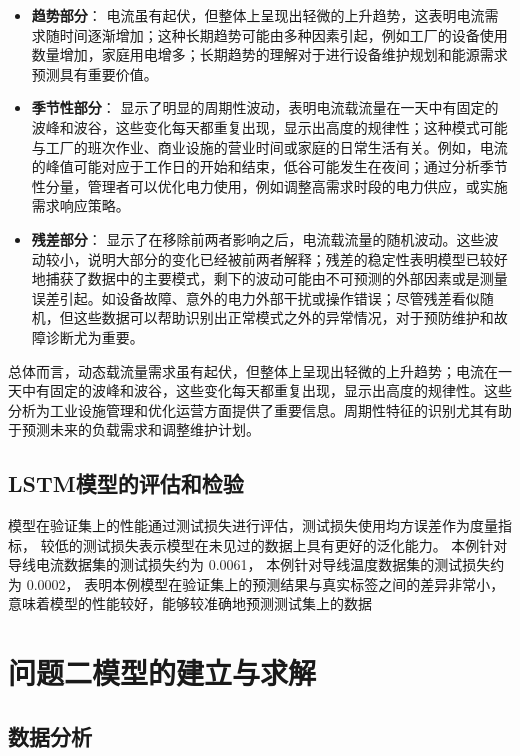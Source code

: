 \documentclass[withoutpreface,bwprint]{cumcmthesis}  %
\begin{document}
        \begin{itemize}
            \item \textbf{趋势部分}：
                电流虽有起伏，但整体上呈现出轻微的上升趋势，这表明电流需求随时间逐渐增加；这种长期趋势可能由多种因素引起，例如工厂的设备使用数量增加，家庭用电增多；长期趋势的理解对于进行设备维护规划和能源需求预测具有重要价值。
            \item \textbf{季节性部分}：
                显示了明显的周期性波动，表明电流载流量在一天中有固定的波峰和波谷，这些变化每天都重复出现，显示出高度的规律性；这种模式可能与工厂的班次作业、商业设施的营业时间或家庭的日常生活有关。例如，电流的峰值可能对应于工作日的开始和结束，低谷可能发生在夜间；通过分析季节性分量，管理者可以优化电力使用，例如调整高需求时段的电力供应，或实施需求响应策略。
            \item \textbf{残差部分}：
                显示了在移除前两者影响之后，电流载流量的随机波动。这些波动较小，说明大部分的变化已经被前两者解释；残差的稳定性表明模型已较好地捕获了数据中的主要模式，剩下的波动可能由不可预测的外部因素或是测量误差引起。如设备故障、意外的电力外部干扰或操作错误；尽管残差看似随机，但这些数据可以帮助识别出正常模式之外的异常情况，对于预防维护和故障诊断尤为重要。
        \end{itemize}
        
        总体而言，动态载流量需求虽有起伏，但整体上呈现出轻微的上升趋势；电流在一天中有固定的波峰和波谷，这些变化每天都重复出现，显示出高度的规律性。这些分析为工业设施管理和优化运营方面提供了重要信息。周期性特征的识别尤其有助于预测未来的负载需求和调整维护计划。

	\subsection {LSTM模型的评估和检验}
        模型在验证集上的性能通过测试损失进行评估，测试损失使用均方误差作为度量指标，
        较低的测试损失表示模型在未见过的数据上具有更好的泛化能力。
        本例针对导线电流数据集的测试损失约为 0.0061，
        本例针对导线温度数据集的测试损失约为 0.0002，
        表明本例模型在验证集上的预测结果与真实标签之间的差异非常小，
        意味着模型的性能较好，能够较准确地预测测试集上的数据

        
	\section{问题二模型的建立与求解}
	\subsection{数据分析}
\end{document}
